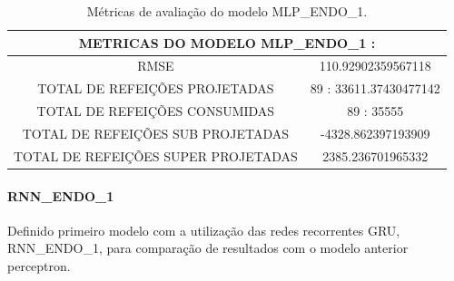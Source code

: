 \documentclass[	12pt, Times, openright, twoside, a4paper, english, brazil]{abntex2}
\begin{document}
                \begin{table}[!ht]
                \centering
                \begin{tabular}{|c|c|}
                \hline
                \multicolumn{2}{c}{METRICAS DO MODELO MLP\_ENDO\_1 :}\\ \hline
                RMSE &  110.92902359567118\\
                TOTAL DE REFEIÇÕES PROJETADAS & 89 : 33611.37430477142\\
                TOTAL DE REFEIÇÕES CONSUMIDAS & 89 : 35555\\
                TOTAL DE REFEIÇÕES SUB PROJETADAS & -4328.862397193909\\
                TOTAL DE REFEIÇÕES SUPER PROJETADAS & 2385.236701965332\\
                \hline
                \end{tabular} 
                \caption{Métricas de avaliação do modelo MLP\_ENDO\_1.}
                \label{table:case1_mlp_endo1_val_table}
                \end{table}
                 
              
              \paragraph{RNN\_ENDO\_1}
               Definido primeiro modelo com a utilização das redes recorrentes GRU, RNN\_ENDO\_1, para comparação de resultados com o modelo anterior perceptron.
                \begin{figure}[H]
                \end{figure}
\end{document}
